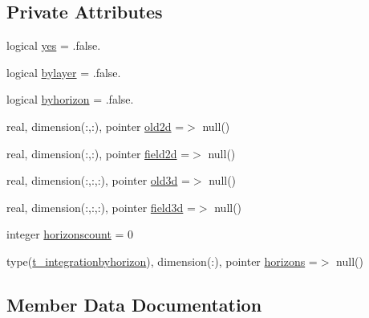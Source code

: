 \subsection*{Private Attributes}
\begin{DoxyCompactItemize}
\item 
logical \mbox{\hyperlink{structmoduleporousmedia_1_1t__integrationinfo_afa30e72cb5e76c38bc76c42cc95d55ae}{yes}} = .false.
\item 
logical \mbox{\hyperlink{structmoduleporousmedia_1_1t__integrationinfo_a935ab6b8586da0a82c5e95093f39e5ab}{bylayer}} = .false.
\item 
logical \mbox{\hyperlink{structmoduleporousmedia_1_1t__integrationinfo_a6bcbbd080d1121518c1f5a340f7f36b7}{byhorizon}} = .false.
\item 
real, dimension(\+:,\+:), pointer \mbox{\hyperlink{structmoduleporousmedia_1_1t__integrationinfo_a4b62fd60c83d71ac3f820a5a6c5a2a28}{old2d}} =$>$ null()
\item 
real, dimension(\+:,\+:), pointer \mbox{\hyperlink{structmoduleporousmedia_1_1t__integrationinfo_a6a6af74fcc05d4cd07fd06b492f4a1a4}{field2d}} =$>$ null()
\item 
real, dimension(\+:,\+:,\+:), pointer \mbox{\hyperlink{structmoduleporousmedia_1_1t__integrationinfo_ab6c06fa107cb2ba5109b398bb9f2a627}{old3d}} =$>$ null()
\item 
real, dimension(\+:,\+:,\+:), pointer \mbox{\hyperlink{structmoduleporousmedia_1_1t__integrationinfo_a9e2dc48997d24d9b276d7d5aa0ce0242}{field3d}} =$>$ null()
\item 
integer \mbox{\hyperlink{structmoduleporousmedia_1_1t__integrationinfo_a742f29bc114c0363195fa7d578c24008}{horizonscount}} = 0
\item 
type(\mbox{\hyperlink{structmoduleporousmedia_1_1t__integrationbyhorizon}{t\+\_\+integrationbyhorizon}}), dimension(\+:), pointer \mbox{\hyperlink{structmoduleporousmedia_1_1t__integrationinfo_a680d5e94c3a7e1fafdc44b88261b47d6}{horizons}} =$>$ null()
\end{DoxyCompactItemize}


\subsection{Member Data Documentation}
\mbox{\label{structmoduleporousmedia_1_1t__integrationinfo_a6bcbbd080d1121518c1f5a340f7f36b7}} 
